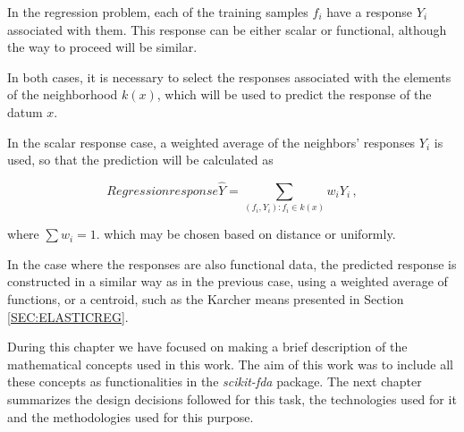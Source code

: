 In the regression problem, each of the training samples $f_i$ have a
response $Y_i$ associated with them. This response can be either scalar or
functional, although the way to proceed will be similar.

In both cases, it is necessary to select the responses associated with the
elements of the neighborhood $k(x)$, which will be used to predict the response
of the datum $x$.

In the scalar response case, a weighted average of the neighbors’ responses
$Y_i$ is used, so that the prediction will be calculated as

\begin{equation}{Regression response}
\hat Y = \sum_{(f_i, Y_i) : f_i \in k(x)} w_i Y_i \, ,
\end{equation}

where $\sum w_i = 1$.
which may be chosen based on distance or uniformly.

In the case where the responses are also functional data,
the predicted response is constructed in a similar way as in the previous
case, using a weighted average of functions, or a centroid, such as the
Karcher means presented in Section \ref{SEC:ELASTICREG}.

During this chapter we have focused on making a brief description of the
mathematical concepts used in this work. The aim of this work was to include
all these concepts as functionalities in the \textit{scikit-fda} package.
The next chapter summarizes the design decisions followed for
this task, the technologies used for it and the methodologies used for this purpose.

